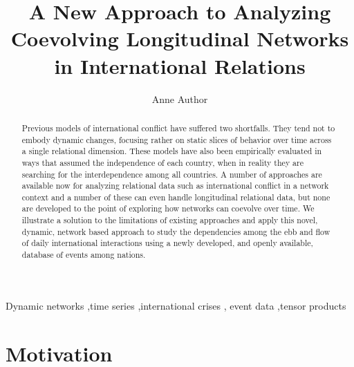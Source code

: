 \documentclass[3p,times,twocolumn,authoryear,12pt]{elsarticle}
\begin{document}
\begin{frontmatter}

\title{A New Approach to Analyzing Coevolving Longitudinal Networks in International Relations}



\author{Anne Author}

\begin{abstract}
Previous models of international conflict have suffered two shortfalls. They tend not to embody dynamic changes, focusing rather on static slices of behavior over time across a single relational dimension. These models have also been empirically evaluated in ways that assumed the independence of each country, when in reality they are searching for the interdependence among all countries. A number of approaches are available now for analyzing relational data such as international conflict in a network context and a number of these can even handle longitudinal relational data, but none are developed to the point of exploring how networks can coevolve over time. We illustrate a solution to the limitations of existing approaches and apply this novel, dynamic, network based approach to study the dependencies among the ebb and flow of daily international interactions using a newly developed, and openly available, database of events among nations. 

\end{abstract}

\begin{keyword}
Dynamic networks \sep time series \sep international crises \sep 
event data \sep tensor products
\end{keyword}

\end{frontmatter}

\section{Motivation}
\end{document}
